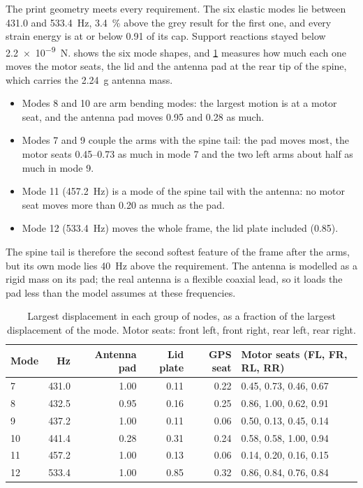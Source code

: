 The print geometry meets every requirement. The six elastic modes lie between 431.0 and \SI{533.4}{Hz}, \SI{3.4}{\percent} above the grey result for the first one, and every strain energy is at or below 0.91 of its cap. Support reactions stayed below \SI{2.2e-9}{N}.  shows the six mode shapes, and \cref{tab:verification-modes} measures how much each one moves the motor seats, the lid and the antenna pad at the rear tip of the spine, which carries the \SI{2.24}{g} antenna mass.
\begin{itemize}
\item Modes 8 and 10 are arm bending modes: the largest motion is at a motor seat, and the antenna pad moves 0.95 and 0.28 as much.
\item Modes 7 and 9 couple the arms with the spine tail: the pad moves most, the motor seats \numrange{0.45}{0.73} as much in mode 7 and the two left arms about half as much in mode 9.
\item Mode 11 (\SI{457.2}{Hz}) is a mode of the spine tail with the antenna: no motor seat moves more than 0.20 as much as the pad.
\item Mode 12 (\SI{533.4}{Hz}) moves the whole frame, the lid plate included (0.85).
\end{itemize}
The spine tail is therefore the second softest feature of the frame after the arms, but its own mode lies \SI{40}{Hz} above the requirement. The antenna is modelled as a rigid mass on its pad; the real antenna is a flexible coaxial lead, so it loads the pad less than the model assumes at these frequencies.

\begin{table}[htbp]
\centering\small
\caption{Largest displacement in each group of nodes, as a fraction of the largest displacement of the mode. Motor seats: front left, front right, rear left, rear right.}\label{tab:verification-modes}
\begin{tabular}{@{}lrrrrl@{}}
\toprule
Mode & \si{Hz} & Antenna pad & Lid plate & GPS seat & Motor seats (FL, FR, RL, RR)\\
\midrule
7 & 431.0 & 1.00 & 0.11 & 0.22 & 0.45, 0.73, 0.46, 0.67\\
8 & 432.5 & 0.95 & 0.16 & 0.25 & 0.86, 1.00, 0.62, 0.91\\
9 & 437.2 & 1.00 & 0.11 & 0.06 & 0.50, 0.13, 0.45, 0.14\\
10 & 441.4 & 0.28 & 0.31 & 0.24 & 0.58, 0.58, 1.00, 0.94\\
11 & 457.2 & 1.00 & 0.13 & 0.06 & 0.14, 0.20, 0.16, 0.15\\
12 & 533.4 & 1.00 & 0.85 & 0.32 & 0.86, 0.84, 0.76, 0.84\\
\bottomrule
\end{tabular}
\end{table}

